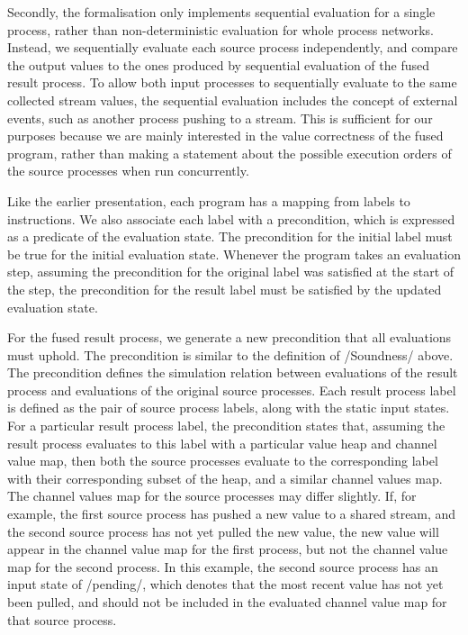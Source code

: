 Secondly, the formalisation only implements sequential evaluation for a single process, rather than non-deterministic evaluation for whole process networks.
Instead, we sequentially evaluate each source process independently, and compare the output values to the ones produced by sequential evaluation of the fused result process.
To allow both input processes to sequentially evaluate to the same collected stream values, the sequential evaluation includes the concept of external events, such as another process pushing to a stream.
This is sufficient for our purposes because we are mainly interested in the value correctness of the fused program, rather than making a statement about the possible execution orders of the source processes when run concurrently.

Like the earlier presentation, each program has a mapping from labels to instructions.
We also associate each label with a precondition, which is expressed as a predicate of the evaluation state.
The precondition for the initial label must be true for the initial evaluation state.
Whenever the program takes an evaluation step, assuming the precondition for the original label was satisfied at the start of the step, the precondition for the result label must be satisfied by the updated evaluation state.

For the fused result process, we generate a new precondition that all evaluations must uphold.
The precondition is similar to the definition of \Hs/Soundness/ above.
The precondition defines the simulation relation between evaluations of the result process and evaluations of the original source processes.
Each result process label is defined as the pair of source process labels, along with the static input states.
For a particular result process label, the precondition states that, assuming the result process evaluates to this label with a particular value heap and channel value map, then both the source processes evaluate to the corresponding label with their corresponding subset of the heap, and a similar channel values map.
The channel values map for the source processes may differ slightly.
If, for example, the first source process has pushed a new value to a shared stream, and the second source process has not yet pulled the new value, the new value will appear in the channel value map for the first process, but not the channel value map for the second process.
In this example, the second source process has an input state of \Hs/pending/, which denotes that the most recent value has not yet been pulled, and should not be included in the evaluated channel value map for that source process.

